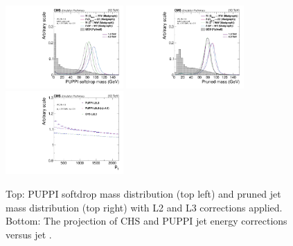 \begin{figure}[h!]
\centering
\includegraphics[width=0.4\textwidth]{figures/analysis/search2/AN-16-235/plots/gen_SoftdropMass.pdf}
\includegraphics[width=0.4\textwidth]{figures/analysis/search2/AN-16-235/plots/gen_PrunedMass.pdf}\\
\includegraphics[width=0.4\textwidth]{figures/analysis/search2/AN-16-235/plots/JECvsPT.pdf}
\caption{Top: PUPPI softdrop mass distribution (top left) and pruned jet mass distribution (top right) with L2 and L3 corrections applied. Bottom: The projection of CHS and PUPPI jet energy corrections versus jet \PT.}
\label{fig:searchII:wtagmass}
\end{figure}

